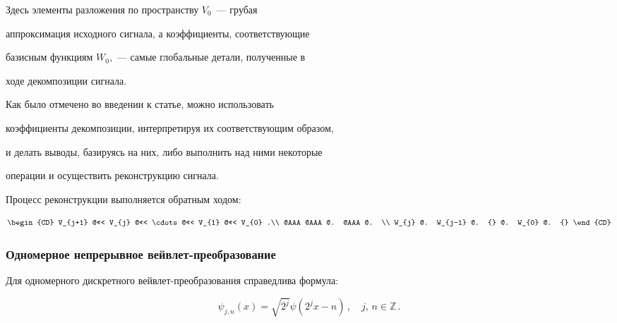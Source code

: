 %

Здесь элементы разложения по пространству $V_0$~--- грубая

аппроксимация исходного сигнала, а коэффициенты, соответствующие

базисным функциям $W_0$,~--- самые глобальные детали, полученные в

ходе декомпозиции сигнала.



Как было отмечено во введении к статье, можно использовать

коэффициенты декомпозиции, интерпретируя их соответствующим образом,

и делать выводы, базируясь на них, либо выполнить над ними некоторые

операции и осуществить реконструкцию сигнала.



Процесс реконструкции выполняется обратным ходом:

\begin{equation*}

\begin{CD}

 V_{j+1} @<<< V_{j} @<<< \cdots @<<< V_{1} @<<< V_{0} .\\

  @AAA        @AAA        @.      @AAA       @.  \\

  W_{j}   @. W_{j-1} @.   {}   @. W_{0}  @.  {}

\end{CD}

\end{equation*}



\subsubsection{Одномерное непрерывное вейвлет-преобразование}



Для одномерного дискретного вейвлет-преобразования справедлива фор\-мула:

\begin{equation*}


    \psi_{j,n}(x)=\sqrt{2^j}\psi(2^jx-n)\,, \quad j,\,n\in\mathbb{Z}\,.

\end{equation*}



